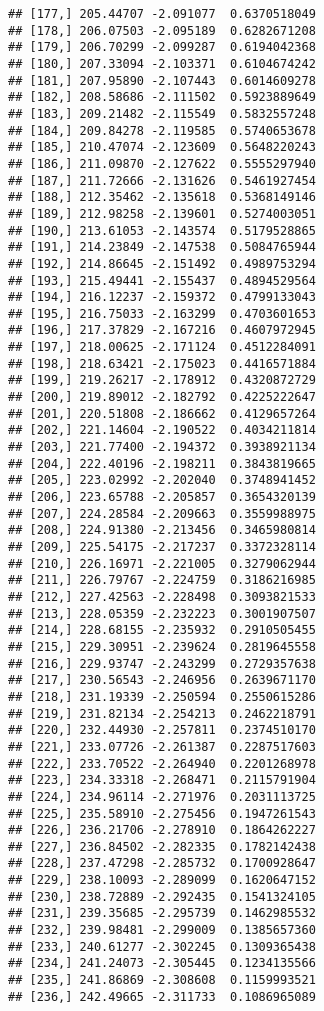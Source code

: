 \documentclass[]{book}
\theoremstyle{definition}
\theoremstyle{definition}
\theoremstyle{definition}
\theoremstyle{remark}
\begin{document}
\begin{verbatim}
## [177,] 205.44707 -2.091077  0.6370518049
## [178,] 206.07503 -2.095189  0.6282671208
## [179,] 206.70299 -2.099287  0.6194042368
## [180,] 207.33094 -2.103371  0.6104674242
## [181,] 207.95890 -2.107443  0.6014609278
## [182,] 208.58686 -2.111502  0.5923889649
## [183,] 209.21482 -2.115549  0.5832557248
## [184,] 209.84278 -2.119585  0.5740653678
## [185,] 210.47074 -2.123609  0.5648220243
## [186,] 211.09870 -2.127622  0.5555297940
## [187,] 211.72666 -2.131626  0.5461927454
## [188,] 212.35462 -2.135618  0.5368149146
## [189,] 212.98258 -2.139601  0.5274003051
## [190,] 213.61053 -2.143574  0.5179528865
## [191,] 214.23849 -2.147538  0.5084765944
## [192,] 214.86645 -2.151492  0.4989753294
## [193,] 215.49441 -2.155437  0.4894529564
## [194,] 216.12237 -2.159372  0.4799133043
## [195,] 216.75033 -2.163299  0.4703601653
## [196,] 217.37829 -2.167216  0.4607972945
## [197,] 218.00625 -2.171124  0.4512284091
## [198,] 218.63421 -2.175023  0.4416571884
## [199,] 219.26217 -2.178912  0.4320872729
## [200,] 219.89012 -2.182792  0.4225222647
## [201,] 220.51808 -2.186662  0.4129657264
## [202,] 221.14604 -2.190522  0.4034211814
## [203,] 221.77400 -2.194372  0.3938921134
## [204,] 222.40196 -2.198211  0.3843819665
## [205,] 223.02992 -2.202040  0.3748941452
## [206,] 223.65788 -2.205857  0.3654320139
## [207,] 224.28584 -2.209663  0.3559988975
## [208,] 224.91380 -2.213456  0.3465980814
## [209,] 225.54175 -2.217237  0.3372328114
## [210,] 226.16971 -2.221005  0.3279062944
## [211,] 226.79767 -2.224759  0.3186216985
## [212,] 227.42563 -2.228498  0.3093821533
## [213,] 228.05359 -2.232223  0.3001907507
## [214,] 228.68155 -2.235932  0.2910505455
## [215,] 229.30951 -2.239624  0.2819645558
## [216,] 229.93747 -2.243299  0.2729357638
## [217,] 230.56543 -2.246956  0.2639671170
## [218,] 231.19339 -2.250594  0.2550615286
## [219,] 231.82134 -2.254213  0.2462218791
## [220,] 232.44930 -2.257811  0.2374510170
## [221,] 233.07726 -2.261387  0.2287517603
## [222,] 233.70522 -2.264940  0.2201268978
## [223,] 234.33318 -2.268471  0.2115791904
## [224,] 234.96114 -2.271976  0.2031113725
## [225,] 235.58910 -2.275456  0.1947261543
## [226,] 236.21706 -2.278910  0.1864262227
## [227,] 236.84502 -2.282335  0.1782142438
## [228,] 237.47298 -2.285732  0.1700928647
## [229,] 238.10093 -2.289099  0.1620647152
## [230,] 238.72889 -2.292435  0.1541324105
## [231,] 239.35685 -2.295739  0.1462985532
## [232,] 239.98481 -2.299009  0.1385657360
## [233,] 240.61277 -2.302245  0.1309365438
## [234,] 241.24073 -2.305445  0.1234135566
## [235,] 241.86869 -2.308608  0.1159993521
## [236,] 242.49665 -2.311733  0.1086965089

\end{verbatim}
\end{document}
